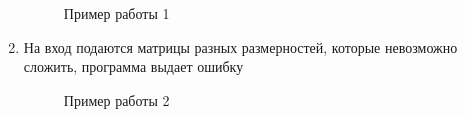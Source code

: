 \documentclass[12pt, a4paper]{article}
\begin{document}
\begin{enumerate}
\begin{figure}[h]
  		\caption{Пример работы 1}
	\end{figure}
	\newpage
	\item На вход подаются матрицы разных размерностей, которые невозможно 
	сложить, программа выдает ошибку
	\begin{figure}[h]
  		\caption{Пример работы 2}
	\end{figure}
\newpage
\end{enumerate}
\end{document}
